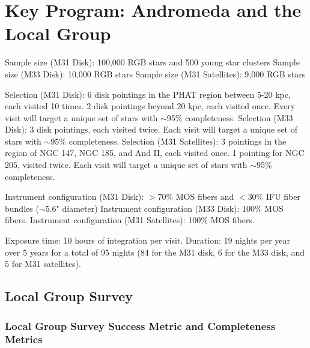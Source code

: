 \documentclass[11pt,a4paper,twoside,onecolumn,openany,final,oldfontcommands]{memoir}
\begin{document}

\newpage

\chapter{Key Program: Andromeda and the Local Group}\label{prog:localgroup}

\begin{programrequirement}

\reqitem Sample size (M31 Disk): 100,000 RGB stars and 500 young star clusters
\reqitem Sample size (M33 Disk): 10,000 RGB stars
\reqitem Sample size (M31 Satellites): 9,000 RGB stars

\reqitem Selection (M31 Disk): 6 disk pointings in the PHAT region between 5-20 kpc, each visited 10 times. 2 disk pointings beyond 20 kpc, each visited once. Every visit will target a unique set of stars with $\sim$95\% completeness.
\reqitem Selection (M33 Disk): 3 disk pointings, each visited twice. Each visit will target a unique set of stars with $\sim$95\% completeness.
\reqitem Selection (M31 Satellites): 3 pointings in the region of NGC 147, NGC 185, and And II, each visited once. 1 pointing for NGC 205, visited twice. Each visit will target a unique set of stars with $\sim$95\% completeness.

\reqitem Instrument configuration (M31 Disk): $>$70\% MOS fibers and $<$30\% IFU fiber bundles ($\sim$5.6" diameter)
\reqitem Instrument configuration (M33 Disk): 100\% MOS fibers.
\reqitem Instrument configuration (M31 Satellites): 100\% MOS fibers.

\reqitem Exposure time: 10 hours of integration per visit.
\reqitem Duration: 19 nights per year over 5 years for a total of 95 nights (84 for the M31 disk, 6 for the M33 disk, and 5 for M31 satellites).

\end{programrequirement}

\section{Local Group Survey}

\subsection{Local Group Survey Success Metric and Completeness Metrics}
\end{document}
